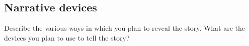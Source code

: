 \subsection{Narrative devices}%
Describe the various ways in which you plan to reveal the story. What are the
devices you plan to use to tell the story?